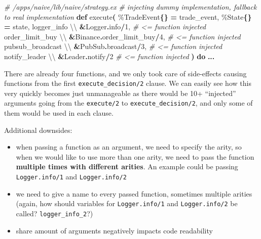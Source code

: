 \documentclass[
  oneside]{book}
\newenvironment{Shaded}{\begin{snugshade}}{\end{snugshade}}
\newcommand{\CommentTok}[1]{\textcolor[rgb]{0.56,0.35,0.01}{\textit{#1}}}
\newcommand{\ConstantTok}[1]{\textcolor[rgb]{0.56,0.35,0.01}{#1}}
\newcommand{\DecValTok}[1]{\textcolor[rgb]{0.00,0.00,0.81}{#1}}
\newcommand{\FunctionTok}[1]{\textcolor[rgb]{0.13,0.29,0.53}{\textbf{#1}}}
\newcommand{\KeywordTok}[1]{\textcolor[rgb]{0.13,0.29,0.53}{\textbf{#1}}}
\newcommand{\NormalTok}[1]{#1}
\newcommand{\OperatorTok}[1]{\textcolor[rgb]{0.81,0.36,0.00}{\textbf{#1}}}
\providecommand{\tightlist}{%
  \setlength{\itemsep}{0pt}\setlength{\parskip}{0pt}}
\begin{document}
\begin{Shaded}
\begin{Highlighting}[]
\CommentTok{\# /apps/naive/lib/naive/strategy.ex}
\CommentTok{\# injecting dummy implementation, fallback to real implementation}
\KeywordTok{def}\NormalTok{ execute}\FunctionTok{(}
\NormalTok{  \%}\ConstantTok{TradeEvent}\FunctionTok{\{\}} \OperatorTok{=}\NormalTok{ trade\_event,}
\NormalTok{  \%}\ConstantTok{State}\FunctionTok{\{\}} \OperatorTok{=}\NormalTok{ state,}
\NormalTok{  logger\_info \textbackslash{}\textbackslash{} }\OperatorTok{\&}\ConstantTok{Logger}\OperatorTok{.}\NormalTok{info}\OperatorTok{/}\DecValTok{1}\NormalTok{, }\CommentTok{\# \textless{}= function injected}
\NormalTok{  order\_limit\_buy \textbackslash{}\textbackslash{} }\OperatorTok{\&}\ConstantTok{Binance}\OperatorTok{.}\NormalTok{order\_limit\_buy}\OperatorTok{/}\DecValTok{4}\NormalTok{, }\CommentTok{\# \textless{}= function injected}
\NormalTok{  pubsub\_broadcast \textbackslash{}\textbackslash{} }\OperatorTok{\&}\ConstantTok{PubSub}\OperatorTok{.}\NormalTok{broadcast}\OperatorTok{/}\DecValTok{3}\NormalTok{, }\CommentTok{\# \textless{}= function injected}
\NormalTok{  notify\_leader \textbackslash{}\textbackslash{} }\OperatorTok{\&}\ConstantTok{Leader}\OperatorTok{.}\NormalTok{notify}\OperatorTok{/}\DecValTok{2} \CommentTok{\# \textless{}= function injected}
\FunctionTok{)} \KeywordTok{do}
  \OperatorTok{...}
\end{Highlighting}
\end{Shaded}

There are already four functions, and we only took care of side-effects causing functions from the first \texttt{execute\_decision/2} clause. We can easily see how this very quickly becomes just unmanageable as there would be 10+ ``injected'' arguments going from the \texttt{execute/2} to \texttt{execute\_decision/2}, and only some of them would be used in each clause.

Additional downsides:

\begin{itemize}
\tightlist
\item
  when passing a function as an argument, we need to specify the arity, so when we would like to use more than one arity, we need to pass the function \textbf{multiple times with different arities}. An example could be passing \texttt{Logger.info/1} and \texttt{Logger.info/2}
\item
  we need to give a name to every passed function, sometimes multiple arities (again, how should variables for \texttt{Logger.info/1} and \texttt{Logger.info/2} be called? \texttt{logger\_info\_2}?)
\item
  share amount of arguments negatively impacts code readability
\end{itemize}
\end{document}
